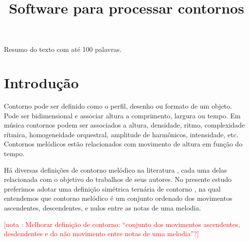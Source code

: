 \documentclass[brazil]{article}
\newcounter{notacounter}
\newcommand{\note}[1]{
  \addtocounter{notacounter}{1}
  \textcolor{red}{[nota \arabic{notacounter}: #1]}
}
\begin{document}
\graphicspath{{figs/}{out/}{data/}{lily/}}

\title{Software para processar contornos}
\author{}{}{}{}

\begin{sumario}
  Resumo do texto com até 100 palavras.  
\end{sumario}








\section{Introdução}
\label{sec:introducao}

Contorno pode ser definido como o perfil, desenho ou formato de um
objeto. Pode ser bidimensional e associar altura a comprimento,
largura ou tempo. Em música contornos podem ser associados a altura,
densidade, ritmo, complexidade rítmica, homogeneidade orquestral,
amplitude de harmônicos, intensidade, etc. Contornos melódicos estão
relacionados com movimento de altura em função do tempo.

Há diversas definições de contorno melódico na literatura
\cite{piston59:harmony,toch77:shaping,schonberg:fundamentals,adams76:melodic,marvin.ea87:relating,morris87:composition,clifford95:contour,beard03:contour},
cada uma delas relacionada com o objetivo do trabalhos de seus
autores. No presente estudo preferimos adotar uma definição simétrica
ternária de contorno \cite{polansky.ea92:possible}, na qual entendemos
que contorno melódico é um conjunto ordenado dos movimentos
ascendentes, descendentes, e nulos entre as notas de uma
melodia. \note{Melhorar definição de contorno: ``conjunto dos
  movimentos ascendentes, desdendentes e do não movimento entre notas
  de uma melodia''?}
\end{document}
